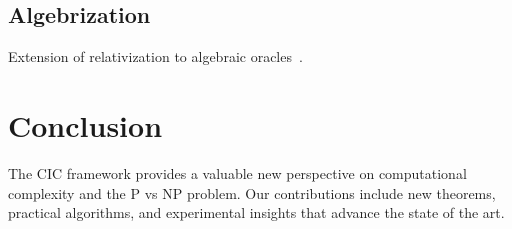 \documentclass[11pt,a4paper]{article}
\begin{document}
\subsection{Algebrization}
Extension of relativization to algebraic oracles~\cite{aaronson2009}.

\section{Conclusion}\label{sec:conclusion}

The CIC framework provides a valuable new perspective on computational complexity and the P vs NP problem. Our contributions include new theorems, practical algorithms, and experimental insights that advance the state of the art.



\end{document}
